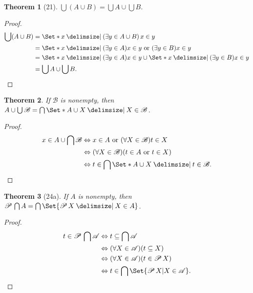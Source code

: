 \documentclass[12pt]{article}
\theoremstyle{plain}
\newtheorem*{exthm}{Theorem}
\theoremstyle{remark}
\theoremstyle{definition}
\theoremstyle{remark}
\newcommand{\powerset}{\mathscr{P}\,}
\providecommand\st{}
\newcommand\SetSymbol[1][]{%
  \nonscript\:#1\vert%
  \allowbreak%
  \nonscript\:
\mathopen{}}
\renewcommand\st{\SetSymbol[\delimsize]}
\renewcommand{\iff}{\Leftrightarrow}
\begin{document}
\begin{exthm}[21]
  $\bigcup (A \cup B) = \bigcup A \cup \bigcup B$.
\end{exthm}
\begin{proof}
  \begin{align*}
    \bigcup (A \cup B) &= \Set*{x \st (\exists y \in A \cup B)\, x \in y}\\
                       &= \Set*{x \st (\exists y \in A)x \in y \text{ or } (\exists y \in B) x \in y}\\
                       &= \Set*{x \st (\exists y \in A)x \in y} \cup \Set*{x \st (\exists y \in B) x \in y}\\
                       &= \bigcup A \cup \bigcup B.
  \end{align*}
\end{proof}
\begin{exthm}
  If $\mathscr{B}$ is nonempty, then $A \cup \bigcup \mathscr{B} = \bigcap \Set*{A \cup X \st X \in \mathscr{B}}$.
\end{exthm}
\begin{proof}
  \begin{align*}
    x \in A \cup \bigcap \mathscr{B} &\iff x \in A \text{ or } (\forall X \in \mathscr{B}) t \in X\\
                                     &\iff (\forall X \in \mathscr{B}) (t \in A \text{ or } t \in X)\\
                                     &\iff t \in \bigcap\Set*{A \cup X \st t \in \mathscr{B}}.
  \end{align*}
\end{proof}

\begin{exthm}[24a]
  If $A$ is nonempty, then $\powerset \bigcap A = \bigcap \Set{\powerset X \st X \in A}$.
\end{exthm}
\begin{proof}
  \begin{align*}
    t \in \powerset \bigcap \mathscr{A} &\iff t \subseteq \bigcap \mathscr{A}\\
                                        &\iff (\forall X \in \mathscr{A}) (t \subseteq X)\\
                                        &\iff (\forall X \in \mathscr{A}) (t \in \powerset X)\\
                                        &\iff t \in \bigcap \Set{\powerset X | X \in \mathscr{A}}.
  \end{align*}
\end{proof}
\end{document}
